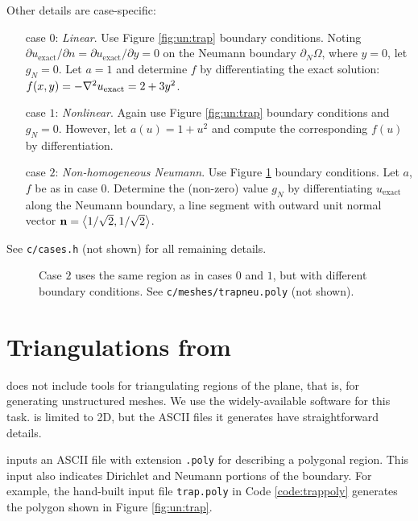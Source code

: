 Other details are case-specific:
\begin{itemize}
\item[case $0$:] \emph{Linear}.  Use Figure \ref{fig:un:trap} boundary conditions.  Noting $\partial u_{\text{exact}}/\partial n = \partial u_{\text{exact}}/\partial y = 0$ on the Neumann boundary $\partial_N \Omega$, where $y=0$, let $g_N=0$.  Let $a=1$ and determine $f$ by differentiating the exact solution: $f(x,y) = -\nabla^2 u_{\text{exact}} = 2 + 3 y^2$.
\item[case $1$:] \emph{Nonlinear}.  Again use Figure \ref{fig:un:trap} boundary conditions and $g_N=0$.  However, let $a(u) = 1+u^2$ and compute the corresponding $f(u)$ by differentiation.
\item[case $2$:] \emph{Non-homogeneous Neumann}.  Use Figure \ref{fig:un:trapneu} boundary conditions.  Let $a$, $f$ be as in case $0$.  Determine the (non-zero) value $g_N$ by differentiating $u_{\text{exact}}$ along the Neumann boundary, a line segment with outward unit normal vector $\mathbf{n} = \left<1/\sqrt{2},1/\sqrt{2}\right>$.
\end{itemize}
See \texttt{c/\CODELOC cases.h} (not shown) for all remaining details.

\begin{figure}

\caption{Case $2$ uses the same region as in cases $0$ and $1$, but with different boundary conditions.  See \texttt{c/\CODELOC meshes/trapneu.poly} (not shown).}
\label{fig:un:trapneu}
\end{figure}


\section{Triangulations from \Triangle}

\PETSc does not include tools for triangulating regions of the plane, that is, for generating unstructured meshes.  We use the widely-available \Triangle{} software \citep{Shewchuk1996} for this task.  \Triangle is limited to 2D, but the ASCII files it generates have straightforward details.

\Triangle inputs an ASCII file with extension \texttt{.poly} for describing a polygonal region.  This input also indicates Dirichlet and Neumann portions of the boundary.  For example, the hand-built input file \texttt{trap.poly} in Code \ref{code:trappoly} generates the polygon shown in Figure \ref{fig:un:trap}.

